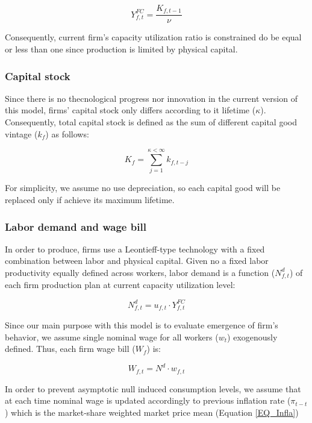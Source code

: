 \documentclass{SelfArx}
\begin{document}
\begin{latex}
\begin{equation}
Y_{f,t}^{FC} = \frac{K_{f,t-1}}{\nu}
\end{equation}
\end{latex}
Consequently, current firm's capacity utilization ratio is constrained do be equal or less than one since production is limited by physical capital.



\subsubsection{Capital stock}
\label{sec:orgfe63efb}


Since there is no thecnological progress nor innovation in the current version of this model, firms' capital stock only differs according to it lifetime (\(\kappa\)).
Consequently, total capital stock is defined as the sum of different capital good vintage (\(k_{f}\)) as follows:

\begin{latex}
\begin{equation}
K_{f} = \sum_{j=1}^{\kappa < \infty} k_{f,t-j}
\end{equation}
\end{latex}
For simplicity, we assume no use depreciation, so each capital good will be replaced only if achieve its maximum lifetime.

\subsubsection{Labor demand and wage bill}
\label{sec:orgbe02ad4}

In order to produce, firms use a Leontieff-type technology with a fixed combination between labor and physical capital.
Given no a fixed labor productivity equally defined across workers, labor demand is a function (\(N^{d}_{f,t}\)) of each firm production plan at current capacity utilization level:

\begin{latex}
\begin{equation}
N^{d}_{f,t} = u_{f,t}\cdot Y^{FC}_{f,t}
\end{equation}
\end{latex}

Since our main purpose with this model is to evaluate emergence of firm's behavior, we assume single nominal wage for all workers (\(w_{t}\)) exogenously defined.
Thus, each firm wage bill (\(W_{f}\)) is:
\begin{latex}
\begin{equation}
W_{f,t} = N^{d}\cdot w_{f,t}
\end{equation}
\end{latex}
In order to prevent asymptotic null induced consumption levels, we assume that at each time nominal wage is updated accordingly to previous inflation rate (\(\pi_{t-t}\)) which is the market-share weighted market price mean (Equation \ref{EQ_Infla})
\end{document}
